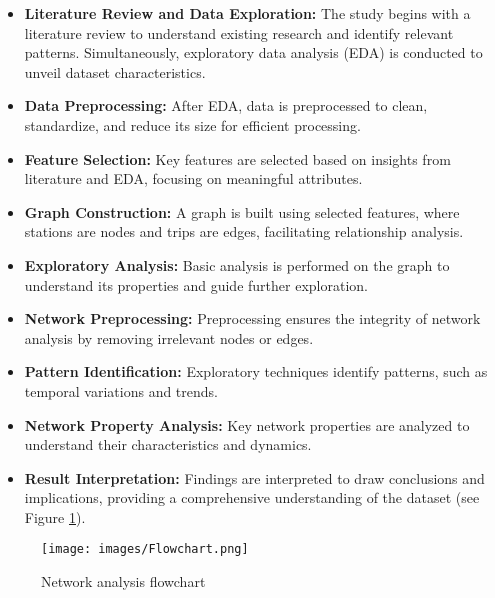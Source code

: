 \documentclass[conference]{IEEEtran}
\begin{document}
\begin{itemize}
    \item \textbf{Literature Review and Data Exploration:} The study begins with a literature review to understand existing research and identify relevant patterns. Simultaneously, exploratory data analysis (EDA) is conducted to unveil dataset characteristics.
    
    \item \textbf{Data Preprocessing:} After EDA, data is preprocessed to clean, standardize, and reduce its size for efficient processing.
    
    \item \textbf{Feature Selection:} Key features are selected based on insights from literature and EDA, focusing on meaningful attributes.
    
    \item \textbf{Graph Construction:} A graph is built using selected features, where stations are nodes and trips are edges, facilitating relationship analysis.
    
    \item \textbf{Exploratory Analysis:} Basic analysis is performed on the graph to understand its properties and guide further exploration.
    
    \item \textbf{Network Preprocessing:} Preprocessing ensures the integrity of network analysis by removing irrelevant nodes or edges.
    
    \item \textbf{Pattern Identification:} Exploratory techniques identify patterns, such as temporal variations and trends.
    
    \item \textbf{Network Property Analysis:} Key network properties are analyzed to understand their characteristics and dynamics.
    
    \item \textbf{Result Interpretation:} Findings are interpreted to draw conclusions and implications, providing a comprehensive understanding of the dataset (see Figure \ref{fig:flowchart}).
\end{itemize}

\begin{figure}
    \centering
    \texttt{[image: images/Flowchart.png]}
    \caption{Network analysis flowchart}
    \label{fig:flowchart}
\end{figure}
\end{document}
